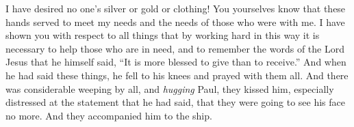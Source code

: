 \begin{biblechapter}
\verse I have desired no one’s silver or gold or clothing!
\verse You yourselves know that these hands served to meet my needs and the needs of those who were with me.
\verse I have shown you with respect to all things that by working hard in this way it is necessary to help those who are in need, and to remember the words of the Lord Jesus that he himself said, “It is more blessed to give than to receive.”
\verse And when he had said these things, he fell to his knees and prayed with them all.
\verse And there was considerable weeping by all, and \textit{hugging} Paul, they kissed him,
\verse especially distressed at the statement that he had said, that they were going to see his face no more. And they accompanied him to the ship.
\end{biblechapter}

